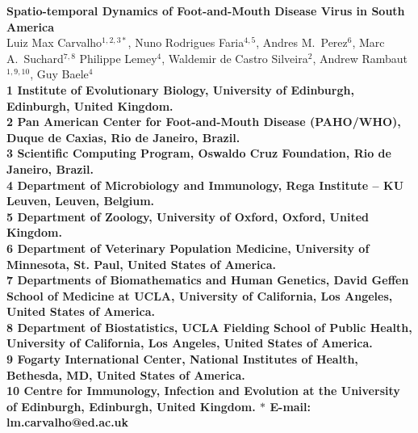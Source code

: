 \documentclass[10pt]{article}
\date{}
\begin{document}
\begin{flushleft}
{\Large
\textbf{Spatio-temporal Dynamics of Foot-and-Mouth Disease Virus in South America}
}
\\
Luiz Max Carvalho$^{1,2,3\ast}$,
Nuno Rodrigues Faria$^{4,5}$,
Andres M.~Perez$^{6}$,
Marc A.~Suchard$^{7,8}$
Philippe Lemey$^{4}$,
Waldemir de Castro Silveira$^{2}$,
Andrew Rambaut$^{1,9,10}$,
Guy Baele$^{4}$
\\
\bf{1} Institute of Evolutionary Biology, University of Edinburgh, Edinburgh, United Kingdom.\\
\bf{2} Pan American Center for Foot-and-Mouth Disease (PAHO/WHO), Duque de Caxias, Rio de Janeiro, Brazil.\\
\bf{3} Scientific Computing Program, Oswaldo Cruz Foundation, Rio de Janeiro, Brazil.\\
\bf{4} Department of Microbiology and Immunology, Rega Institute -- KU Leuven, Leuven, Belgium.\\
\bf{5} Department of Zoology, University of Oxford, Oxford, United Kingdom.\\
\bf{6} Department of Veterinary Population Medicine, University of Minnesota, St. Paul, United States of America.\\
\bf{7} Departments of Biomathematics and Human Genetics, David Geffen School of Medicine at UCLA, University of California, Los Angeles,  United States of America.\\
\bf{8} Department of Biostatistics, UCLA Fielding School of Public Health, University of California, Los Angeles,  United States of America.\\
\bf{9}  Fogarty International Center, National Institutes of Health, Bethesda, MD,  United States of America.\\
\bf{10} Centre for Immunology, Infection and Evolution at the University of Edinburgh, Edinburgh, United Kingdom.
$\ast$ E-mail: lm.carvalho@ed.ac.uk
\end{flushleft}
\end{document}
